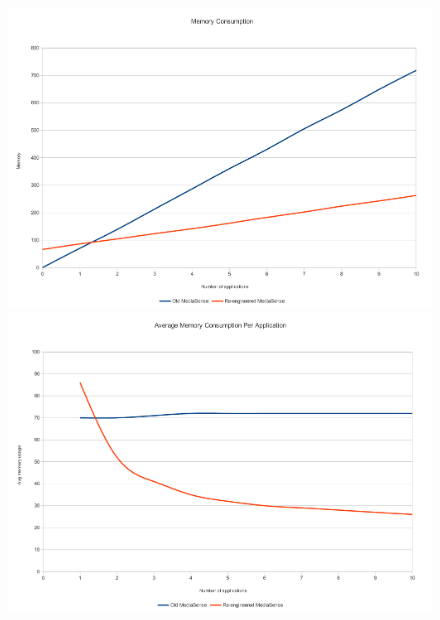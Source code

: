 \begin{figure}[H]
		\centering
    	\includegraphics[scale=0.50]{part_7/test_results/memory.pdf}
    	\includegraphics[scale=0.50]{part_7/test_results/avg_memory.pdf}
\end{figure}



